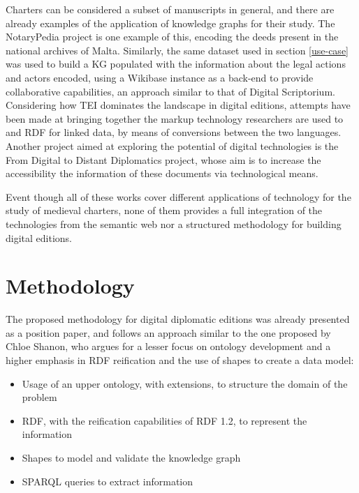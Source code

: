 \documentclass{article}
\begin{document}
Charters can be considered a subset of manuscripts in general, and there are already examples of the application of knowledge graphs for their study.
The NotaryPedia project is one example of this, encoding the deeds present in the national archives of Malta\cite{ellul2019notarypedia}.
Similarly, the same dataset used in section \ref{use-case} was used to build a KG populated with the information about the legal actions and actors encoded, using a Wikibase instance as a back-end to provide collaborative capabilities\cite{alvarez-fidalgo_mckg_2026}, an approach similar to that of Digital Scriptorium\cite{falafios2023scriptorium}.
Considering how TEI dominates the landscape in digital editions, attempts have been made at bringing together the markup technology researchers are used to and RDF for linked data, by means of conversions between the two languages\cite{garcia_gonzalez_converting_2020}.
Another project aimed at exploring the potential of digital technologies is the From Digital to Distant Diplomatics project, whose aim is to increase the accessibility the information of these documents via technological means.

Event though all of these works cover different applications of technology for the study of medieval charters, none of them provides a full integration of the technologies from the semantic web nor a structured methodology for building digital editions.

\section{Methodology}
\label{methodology}

The proposed methodology for digital diplomatic editions was already presented as a position paper\cite{garcia-menendez_unlocking_nodate}, and follows an approach similar to the one proposed by Chloe Shanon, who argues for a lesser focus on ontology development and a higher emphasis in RDF reification and the use of shapes to create a data model:
\begin{itemize}
    \item Usage of an upper ontology, with extensions, to structure the domain of the problem
    \item RDF, with the reification capabilities of RDF 1.2, to represent the information
    \item Shapes to model and validate the knowledge graph
    \item SPARQL queries to extract information
\end{itemize}
\end{document}
